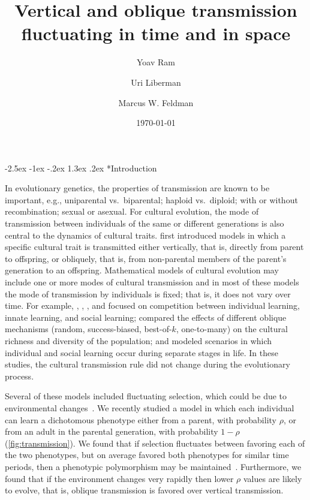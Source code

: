 \documentclass[14pt]{extarticle}
\title{Vertical and oblique transmission fluctuating in time and in space}
\author[a]{Yoav Ram}
\author[b]{Uri Liberman}
\author[a]{Marcus W. Feldman}
\affil[a]{Department of Biology, Stanford University, Stanford, CA}
\affil[b]{School of Mathematical Sciences, Tel Aviv University, Israel}
\date{\today}
\makeatletter
\renewcommand\section{\@startsection {section}{1}{\z@}%
     {-2.5ex \@plus -1ex \@minus -.2ex}%
     {1.3ex \@plus.2ex}%
    {\Large\bfseries}}
\makeatother
\begin{document}
\maketitle


\section*{Introduction}

In evolutionary genetics, the properties of transmission are known to be important, e.g., uniparental vs.\ biparental; haploid vs.\ diploid; with or without recombination; sexual or asexual. For cultural evolution, the mode of transmission between individuals of the same or different generations is also central to the dynamics of cultural traits.
\citet[ch.~3]{Cavalli-Sforza1981} first introduced models in which a specific cultural trait is transmitted either vertically, that is, directly from parent to offspring, or obliquely, that is, from non-parental members of the parent's generation to an offspring.
Mathematical models of cultural evolution may include one or more modes of cultural transmission and in most of these models the mode of transmission by individuals is fixed; that is, it does not vary over time.
For example, \cite{Feldman1996}, \cite{Wakano2004}, \cite{Aoki2005}, and \citet{McElreath2008} focused on competition between individual learning, innate learning, and social learning; \citet{Fogarty2017} compared the effects of different oblique mechanisms (random, success-biased, best-of-$k$, one-to-many) on the cultural richness and diversity of the population; and \citet{Aoki2012} modeled scenarios in which individual and social learning occur during separate stages in life.
In these studies, the cultural transmission rule did not change during the evolutionary process.

Several of these models included fluctuating selection, which could be due to environmental changes~\citep[reviewed in][]{Aoki2014}. 
We recently studied a model in which each individual can learn a dichotomous phenotype either from a parent, with probability $\rho$, or from an adult in the parental generation, with probability $1-\rho$ (\autoref{fig:transmission}).
We found that if selection fluctuates between favoring each of the two phenotypes, but on average favored both phenotypes for similar time periods, then a phenotypic polymorphism may be maintained~\citep{Ram2018}.
Furthermore, we found that if the environment changes very rapidly then lower $\rho$ values are likely to evolve, that is, oblique transmission is favored over vertical transmission.
\end{document}
